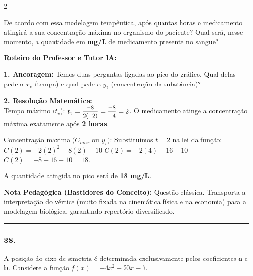 \begin{multicols*}{2}
\begin{enunciadoLiteral}
De acordo com essa modelagem terapêutica, após quantas horas o medicamento atingirá a sua concentração máxima no organismo do paciente? Qual será, nesse momento, a quantidade em \textbf{mg/L} de medicamento presente no sangue?
\end{enunciadoLiteral}

\ifgabarito
    \begin{tcolorbox}[colback=CorTitUm!5, colframe=CorTitUm, boxrule=1pt, arc=4pt, left=6pt, right=6pt, top=6pt, bottom=6pt]
    \small\textbf{\textcolor{CorTitUm}{Roteiro do Professor e Tutor IA:}}\par\vspace{0.1cm}
    \color{CinzaEscuro}
    \textbf{1. Ancoragem:} Temos duas perguntas ligadas ao pico do gráfico. Qual delas pede o $x_v$ (tempo) e qual pede o $y_v$ (concentração da substância)?\par\vspace{0.1cm}
    \textbf{2. Resolução Matemática:}\\
    Tempo máximo ($t_v$):
    $t_v = \mfrac{-8}{2(-2)} = \mfrac{-8}{-4} = 2$.
    O medicamento atinge a concentração máxima exatamente após \textbf{2 horas}.
    
    Concentração máxima ($C_{max}$ ou $y_v$):
    Substituímos $t = 2$ na lei da função:
    $C(2) = -2(2)^2 + 8(2) + 10$
    $C(2) = -2(4) + 16 + 10$
    $C(2) = -8 + 16 + 10 = 18$.
    
    A quantidade atingida no pico será de \textbf{18 mg/L}.
    \end{tcolorbox}
    \vspace{0.15cm}
    
    \begin{boxexplicacao}
    \textbf{Nota Pedagógica (Bastidores do Conceito):} Questão clássica. Transporta a interpretação do vértice (muito fixada na cinemática física e na economia) para a modelagem biológica, garantindo repertório diversificado.
    \end{boxexplicacao}
\fi

\par\vspace{\espacoQuestao}

\noindent\textcolor{CorLinha}{\rule{\linewidth}{0.5pt}} 
\par\vspace{\espacoPreQuestao}
\subsubsection*{38.} 
\begin{enunciadoLiteral}
A posição do eixo de simetria é determinada exclusivamente pelos coeficientes \textbf{a} e \textbf{b}. Considere a função $f(x) = -4x^2 + 20x - 7$.


\end{enunciadoLiteral}
\end{multicols*}
